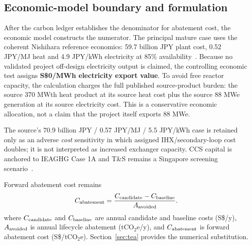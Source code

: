 \subsection{Economic-model boundary and formulation}
After the carbon ledger establishes the denominator for abatement cost, the economic model constructs the numerator. The principal mature case uses the coherent Nishihara reference economics: 59.7 billion JPY plant cost, 0.52 JPY/MJ heat and 4.9 JPY/kWh electricity at 85\% availability~\cite{nishihara2007potential}. Because no validated project off-design electricity output is claimed, the controlling economic test assigns \textbf{S\$0/MWh electricity export value}. To avoid free reactor capacity, the calculation charges the full published source-product burden: the source 370 MWth heat product at its source heat cost plus the source 88 MWe generation at its source electricity cost. This is a conservative economic allocation, not a claim that the project itself exports 88 MWe.

The source's 70.9 billion JPY / 0.57 JPY/MJ / 5.5 JPY/kWh case is retained only as an adverse \emph{cost} sensitivity in which assigned IHX/secondary-loop cost doubles; it is not interpreted as increased exchanger capacity. CCS capital is anchored to IEAGHG Case 1A and T\&S remains a Singapore screening scenario~\cite{ieaghg2017smr,mticcs2025cost}.

Forward abatement cost remains
\begin{equation}\label{eq:abatement-cost-definition}
C_{\rm abatement}=\frac{C_{\rm candidate}-C_{\rm baseline}}{A_{\rm avoided}}.
\end{equation}
where $C_{\rm candidate}$ and $C_{\rm baseline}$ are annual candidate and baseline costs (S\$/y), $A_{\rm avoided}$ is annual lifecycle abatement (tCO$_2$e/y), and $C_{\rm abatement}$ is forward abatement cost (S\$/tCO$_2$e). Section~\ref{sec:tea} provides the numerical substitution.

